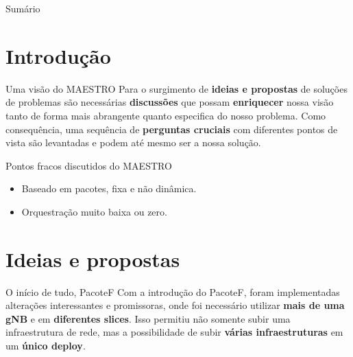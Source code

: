 \documentclass[brazil]{beamer}
\begin{document}
{
    \let\oldheadline\beamertemplateheadline
    \begin{frame}
        \titlepage
    \end{frame}

    \let\beamertemplateheadline\oldheadline
}

\begin{frame}{Sumário}
    \tableofcontents
\end{frame}

\section{Introdução}
\begin{frame}{Uma visão do MAESTRO}
    \hspace{0.5cm}Para o surgimento de \textbf{ideias e propostas} de soluções de problemas 
    são necessárias \textbf{discussões} que possam \textbf{enriquecer} nossa visão tanto de forma mais 
    abrangente quanto especifica do nosso problema. Como consequência, uma sequência 
    de \textbf{perguntas cruciais} com diferentes pontos de vista são levantadas e podem até 
    mesmo ser a nossa solução.
\end{frame}

\begin{frame}{Pontos fracos discutidos do MAESTRO}
    \begin{itemize}
        \item Baseado em pacotes, fixa e não dinâmica.
        \item Orquestração muito baixa ou zero.
    \end{itemize}
\end{frame}


\section{Ideias e propostas}
\begin{frame}{O início de tudo, PacoteF}
    \hspace{0.5cm}Com a introdução do PacoteF, foram implementadas alterações interessantes 
    e promissoras, onde foi necessário utilizar \textbf{mais de uma gNB} e em \textbf{diferentes slices}. 
    Isso permitiu não somente subir uma infraestrutura de rede, mas a possibilidade de subir 
    \textbf{várias infraestruturas} em um \textbf{único deploy}.
\end{frame}
\end{document}
